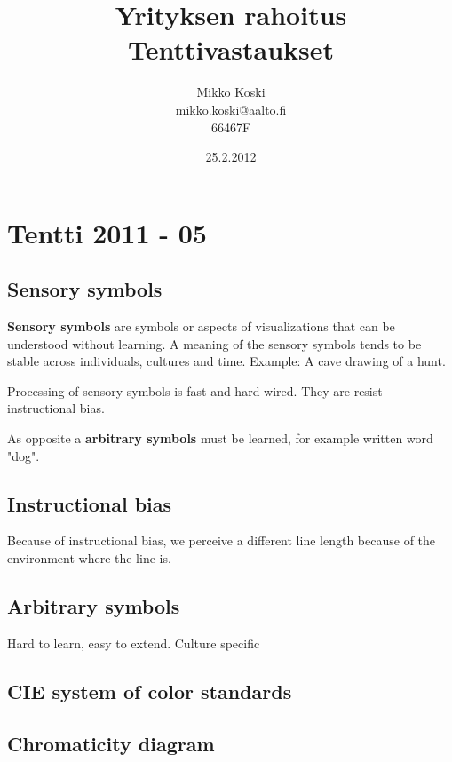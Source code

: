 \documentclass[a4paper]{article}
\begin{document}
\title{\small Yrityksen rahoitus \\ \huge Tenttivastaukset}
\date{25.2.2012}
\author{Mikko Koski \\ mikko.koski@aalto.fi \\ 66467F}
\maketitle

\normalsize
\setlength{\parindent}{0cm}

\section{Tentti 2011 - 05}

\subsection{Sensory symbols}

\textbf{Sensory symbols} are symbols or aspects of visualizations that can be understood without learning. A meaning of the sensory symbols tends to be stable across individuals, cultures and time. Example: A cave drawing of a hunt.

Processing of sensory symbols is fast and hard-wired. They are resist instructional bias.

As opposite a \textbf{arbitrary symbols} must be learned, for example written word "dog".

\subsection{Instructional bias}

Because of instructional bias, we perceive a different line length because of the environment where the line is.

\subsection{Arbitrary symbols}

Hard to learn, easy to extend. Culture specific

\subsection{CIE system of color standards}

\subsection{Chromaticity diagram}
\end{document}
